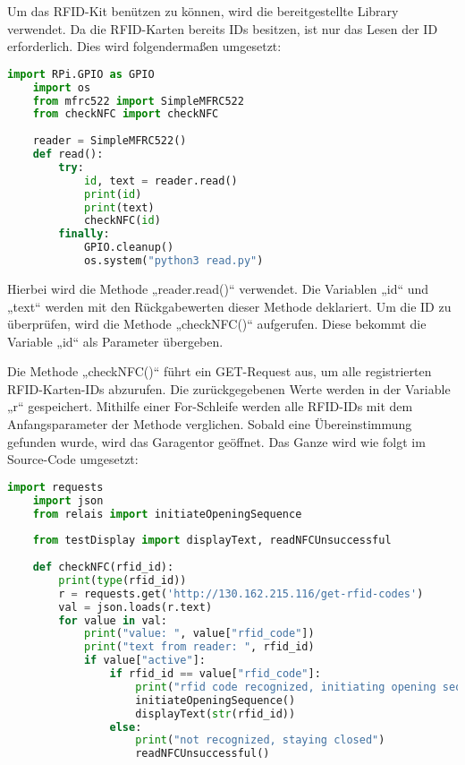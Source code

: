 Um das RFID-Kit benützen zu können, wird die bereitgestellte Library verwendet. 
Da die RFID-Karten bereits IDs besitzen, ist nur das Lesen der ID erforderlich. Dies wird folgendermaßen umgesetzt: 

\begin{lstlisting}[language=Python, caption=Lesen der RFID-Karte]
    import RPi.GPIO as GPIO
    import os
    from mfrc522 import SimpleMFRC522
    from checkNFC import checkNFC
    
    reader = SimpleMFRC522()
    def read():
        try:
            id, text = reader.read()
            print(id)
            print(text)
            checkNFC(id)
        finally:
            GPIO.cleanup()
            os.system("python3 read.py")
\end{lstlisting}

Hierbei wird die Methode „reader.read()“ verwendet. Die Variablen „id“ und „text“ werden mit den Rückgabewerten dieser Methode deklariert. Um die ID zu überprüfen, wird die Methode „checkNFC()“ aufgerufen. Diese bekommt die Variable „id“ als Parameter übergeben.

Die Methode „checkNFC()“ führt ein GET-Request aus, um alle registrierten RFID-Karten-IDs abzurufen. Die zurückgegebenen Werte werden in der Variable „r“ gespeichert. Mithilfe einer For-Schleife werden alle RFID-IDs mit dem Anfangsparameter der Methode verglichen. Sobald eine Übereinstimmung gefunden wurde, wird das Garagentor geöffnet.
\newpage
Das Ganze wird wie folgt im Source-Code umgesetzt: 

\begin{lstlisting}[language=Python, caption=Überprüfung der RFID-Karten-ID]
    import requests
    import json
    from relais import initiateOpeningSequence
    
    from testDisplay import displayText, readNFCUnsuccessful
    
    def checkNFC(rfid_id):
        print(type(rfid_id))
        r = requests.get('http://130.162.215.116/get-rfid-codes')
        val = json.loads(r.text)
        for value in val:
            print("value: ", value["rfid_code"])
            print("text from reader: ", rfid_id)
            if value["active"]:
                if rfid_id == value["rfid_code"]:
                    print("rfid code recognized, initiating opening sequence")
                    initiateOpeningSequence()
                    displayText(str(rfid_id))
                else:
                    print("not recognized, staying closed")
                    readNFCUnsuccessful()
\end{lstlisting}